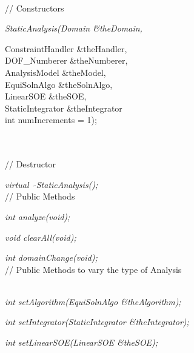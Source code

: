  \\
// Constructors 

{\em StaticAnalysis(Domain \&theDomain, 

\indent\indent\indent\indent ConstraintHandler \&theHandler, \\
\indent\indent\indent\indent DOF\_Numberer \&theNumberer, \\
\indent\indent\indent\indent AnalysisModel \&theModel,\\
\indent\indent\indent\indent EquiSolnAlgo \&theSolnAlgo,\\
\indent\indent\indent\indent LinearSOE \&theSOE, \\
\indent\indent\indent\indent StaticIntegrator \&theIntegrator \\
\indent\indent\indent\indent int numIncrements = 1);} \\ \\
// Destructor 

{\em virtual~ $\tilde{}$StaticAnalysis();}\\  

// Public Methods

{\em int analyze(void);} 

{\em void clearAll(void);} 

{\em int domainChange(void);}\\  

// Public Methods to vary the type of Analysis

\\ 
{\em int setAlgorithm(EquiSolnAlgo \&theAlgorithm);} 

{\em int setIntegrator(StaticIntegrator \&theIntegrator);}

{\em int setLinearSOE(LinearSOE \&theSOE);} 



